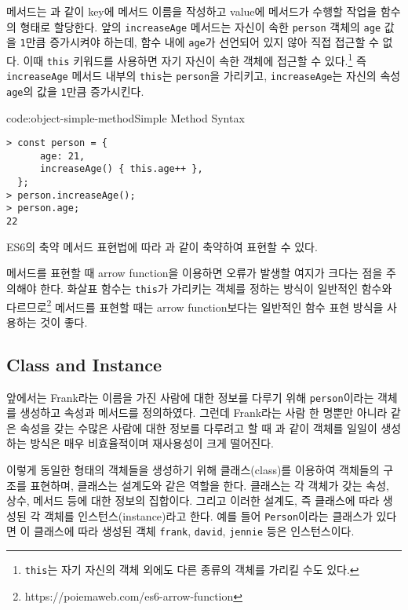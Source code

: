 메서드는 과 같이 key에 메서드 이름을 작성하고 value에 메서드가 수행할 작업을 함수의 형태로 할당한다. 앞의 \texttt{increaseAge} 메서드는 자신이 속한 \texttt{person} 객체의 \texttt{age} 값을 \texttt{1}만큼 증가시켜야 하는데, 함수 내에 \texttt{age}가 선언되어 있지 않아 직접 접근할 수 없다. 이때 \texttt{this} 키워드를 사용하면 자기 자신이 속한 객체에 접근할 수 있다.\footnote{\texttt{this}는 자기 자신의 객체 외에도 다른 종류의 객체를 가리킬 수도 있다.} 즉 \texttt{increaseAge} 메서드 내부의 \texttt{this}는 \texttt{person}을 가리키고, \texttt{increaseAge}는 자신의 속성 \texttt{age}의 값을 \texttt{1}만큼 증가시킨다.

\begin{codeenv}{code:object-simple-method}{Simple Method Syntax}\begin{verbatim}
> const person = {
      age: 21,
      increaseAge() { this.age++ },
  };
> person.increaseAge();
> person.age;
22
\end{verbatim}
\end{codeenv}

ES6의 축약 메서드 표현법에 따라 과 같이 축약하여 표현할 수 있다.

메서드를 표현할 때 arrow function을 이용하면 오류가 발생할 여지가 크다는 점을 주의해야 한다. 화살표 함수는 \texttt{this}가 가리키는 객체를 정하는 방식이 일반적인 함수와 다르므로\footnote{https://poiemaweb.com/es6-arrow-function} 메서드를 표현할 때는 arrow function보다는 일반적인 함수 표현 방식을 사용하는 것이 좋다.

\subsection*{Class and Instance}

앞에서는 Frank라는 이름을 가진 사람에 대한 정보를 다루기 위해 \texttt{person}이라는 객체를 생성하고 속성과 메서드를 정의하였다. 그런데 Frank라는 사람 한 명뿐만 아니라 같은 속성을 갖는 수많은 사람에 대한 정보를 다루려고 할 때 과 같이 객체를 일일이 생성하는 방식은 매우 비효율적이며 재사용성이 크게 떨어진다.

이렇게 동일한 형태의 객체들을 생성하기 위해 클래스(class)를 이용하여 객체들의 구조를 표현하며, 클래스는 설계도와 같은 역할을 한다. 클래스는 각 객체가 갖는 속성, 상수, 메서드 등에 대한 정보의 집합이다. 그리고 이러한 설계도, 즉 클래스에 따라 생성된 각 객체를 인스턴스(instance)라고 한다. 예를 들어 \texttt{Person}이라는 클래스가 있다면 이 클래스에 따라 생성된 객체 \texttt{frank}, \texttt{david}, \texttt{jennie} 등은 인스턴스이다.

